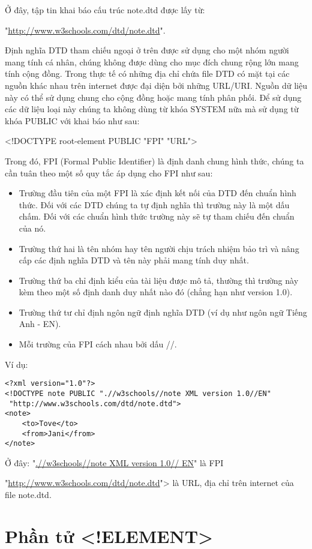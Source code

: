  Ở đây, tập tin khai báo cấu trúc note.dtd được lấy từ:
 
  "\url{http://www.w3schools.com/dtd/note.dtd}".

Định nghĩa DTD tham chiếu ngoại ở trên được sử dụng cho một nhóm người mang tính cá nhân, chúng không được dùng cho mục đích chung rộng lớn mang tính cộng đồng. Trong thực tế có những địa chỉ chứa file DTD có mặt tại các nguồn khác nhau trên internet được đại diện bởi những URL/URI. Nguồn dữ liệu này có thể sử dụng chung cho cộng đồng hoặc mang tính phân phối. Để sử dụng các dữ liệu loại này chúng ta không dùng từ khóa SYSTEM nữa mà sử dụng từ khóa PUBLIC với khai báo như sau:
\begin{center}
 {\ttfamily 	<!DOCTYPE root-element  PUBLIC "FPI" "URL">}
\end{center}

Trong đó, FPI (Formal Public Identifier) là định danh chung hình thức, chúng ta cần tuân theo một số quy tắc áp dụng cho FPI như sau:
 \begin{itemize}
\item 	Trường đầu tiên của một FPI là xác định kết nối của DTD đến chuẩn hình thức. Đối với các DTD chúng ta tự định nghĩa thì trường này là một dấu chấm. Đối với các chuẩn hình thức trường này sẽ tự tham chiếu đến chuẩn của nó.
\item 	Trường thứ hai là tên nhóm hay tên người chịu trách nhiệm bảo trì và nâng cấp các định nghĩa DTD và tên này phải mang tính duy nhất.
\item 	Trường thứ ba chỉ định kiểu của tài liệu được mô tả, thường thì trường này kèm theo một số định danh duy nhất nào đó (chẳng hạn như version 1.0).
\item 	Trường thứ tư chỉ định ngôn ngữ định nghĩa DTD (ví dụ như ngôn ngữ Tiếng Anh - EN).
\item 	Mỗi trường của FPI cách nhau bởi dấu //.
 \end{itemize}
 
Ví dụ:
\begin{lstlisting}
<?xml version="1.0"?>
<!DOCTYPE note PUBLIC ".//w3schools//note XML version 1.0//EN"
 "http://www.w3schools.com/dtd/note.dtd">
<note>
	<to>Tove</to>
	<from>Jani</from>
</note>
\end{lstlisting}

Ở đây:
 "\url{.//w3schools//note XML version 1.0// EN}" là FPI
 
 "\url{http://www.w3schools.com/dtd/note.dtd}"> là URL, địa chỉ trên internet của file note.dtd.
\section{ Phần tử <!ELEMENT>}
\label{muc2.3}

